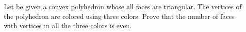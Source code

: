Let be given a convex polyhedron whose all faces are triangular. The vertices of the polyhedron are colored using three colors. Prove that the number of faces with vertices in all the three colors is even.